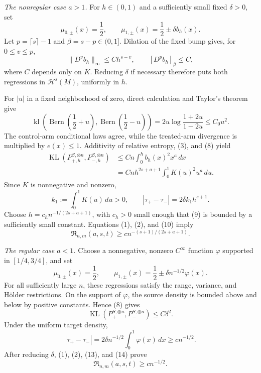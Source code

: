 \emph{The nonregular case \(a>1\).}
For \(h\in(0,1)\) and a sufficiently small fixed \(\delta>0\), set
\[
 \mu_{0,\pm}(x)=\frac12,
 \qquad
 \mu_{1,\pm}(x)=\frac12\pm\delta b_h(x).
\tag{6}
\]
Let \(p=\lceil s\rceil-1\) and \(\beta=s-p\in(0,1]\).  Dilation of the fixed bump gives, for \(0\le v\le p\),
\[
 \lVert D^v b_h\rVert_\infty\le C h^{s-v},
 \qquad [D^p b_h]_{\beta}\le C,
\tag{7}
\]
where \(C\) depends only on \(K\).  Reducing \(\delta\) if necessary therefore puts both regressions in \(\mathcal H^s(M)\), uniformly in \(h\).

For \(|u|\) in a fixed neighborhood of zero, direct calculation and Taylor's theorem give
\[
 \operatorname{kl}\!\left(
  \operatorname{Bern}\!\left(\frac12+u\right),
  \operatorname{Bern}\!\left(\frac12-u\right)
 \right)
 =2u\log\frac{1+2u}{1-2u}
 \le C_0u^2.
\tag{8}
\]
The control-arm conditional laws agree, while the treated-arm divergence is multiplied by \(e(x)\le1\).  Additivity of relative entropy, (3), and (8) yield
\[
 \begin{aligned}
 \operatorname{KL}(P_{+,h}^{S,\otimes n},P_{-,h}^{S,\otimes n})
 &\le Cn\int_0^h b_h(x)^2x^a\,dx\\
 &=Cnh^{2s+a+1}\int_0^1K(u)^2u^a\,du.
 \end{aligned}
\tag{9}
\]
Since \(K\) is nonnegative and nonzero,
\[
 k_1:=\int_0^1K(u)\,du>0,
 \qquad
 |\tau_+-\tau_-|=2\delta k_1h^{s+1}.
\tag{10}
\]
Choose \(h=c_hn^{-1/(2s+a+1)}\), with \(c_h>0\) small enough that (9) is bounded by a sufficiently small constant.  Equations (1), (2), and (10) imply
\[
 \mathfrak R_{n,m}(a,s,t)
 \ge c n^{-(s+1)/(2s+a+1)}.
\tag{11}
\]

\emph{The regular case \(a<1\).}
Choose a nonnegative, nonzero \(C^\infty\) function \(\varphi\) supported in \([1/4,3/4]\), and set
\[
 \mu_{0,\pm}(x)=\frac12,
 \qquad
 \mu_{1,\pm}(x)=\frac12\pm\delta n^{-1/2}\varphi(x).
\tag{12}
\]
For all sufficiently large \(n\), these regressions satisfy the range, variance, and H\"older restrictions.  On the support of \(\varphi\), the source density is bounded above and below by positive constants.  Hence (8) gives
\[
 \operatorname{KL}(P_+^{S,\otimes n},P_-^{S,\otimes n})
 \le C\delta^2.
\tag{13}
\]
Under the uniform target density,
\[
 |\tau_+-\tau_-|
 =2\delta n^{-1/2}\int_0^1\varphi(x)\,dx
 \ge c n^{-1/2}.
\tag{14}
\]
After reducing \(\delta\), (1), (2), (13), and (14) prove
\[
 \mathfrak R_{n,m}(a,s,t)\ge c n^{-1/2}.
\tag{15}
\]

